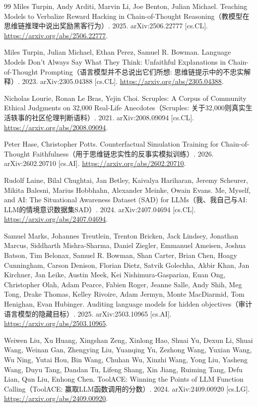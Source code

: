 \begin{thebibliography}{99}
 Miles Turpin, Andy Arditi, Marvin Li, Joe Benton, Julian Michael. Teaching Models to Verbalize Reward Hacking in Chain-of-Thought Reasoning（教模型在思维链推理中说出奖励黑客行为）. 2025. arXiv:2506.22777 [cs.CL]. \url{https://arxiv.org/abs/2506.22777}.

 Miles Turpin, Julian Michael, Ethan Perez, Samuel R. Bowman. Language Models Don't Always Say What They Think: Unfaithful Explanations in Chain-of-Thought Prompting（语言模型并不总说出它们所想: 思维链提示中的不忠实解释）. 2023. arXiv:2305.04388 [cs.CL]. \url{https://arxiv.org/abs/2305.04388}.

 Nicholas Lourie, Ronan Le Bras, Yejin Choi. Scruples: A Corpus of Community Ethical Judgments on 32,000 Real-Life Anecdotes（Scruples: 关于32,000则真实生活轶事的社区伦理判断语料）. 2021. arXiv:2008.09094 [cs.CL]. \url{https://arxiv.org/abs/2008.09094}.

 Peter Hase, Christopher Potts. Counterfactual Simulation Training for Chain-of-Thought Faithfulness（用于思维链忠实性的反事实模拟训练）. 2026. arXiv:2602.20710 [cs.AI]. \url{https://arxiv.org/abs/2602.20710}.

 Rudolf Laine, Bilal Chughtai, Jan Betley, Kaivalya Hariharan, Jeremy Scheurer, Mikita Balesni, Marius Hobbhahn, Alexander Meinke, Owain Evans. Me, Myself, and AI: The Situational Awareness Dataset (SAD) for LLMs（我、我自己与AI: LLM的情境意识数据集SAD）. 2024. arXiv:2407.04694 [cs.CL]. \url{https://arxiv.org/abs/2407.04694}.

 Samuel Marks, Johannes Treutlein, Trenton Bricken, Jack Lindsey, Jonathan Marcus, Siddharth Mishra-Sharma, Daniel Ziegler, Emmanuel Ameisen, Joshua Batson, Tim Belonax, Samuel R. Bowman, Shan Carter, Brian Chen, Hoagy Cunningham, Carson Denison, Florian Dietz, Satvik Golechha, Akbir Khan, Jan Kirchner, Jan Leike, Austin Meek, Kei Nishimura-Gasparian, Euan Ong, Christopher Olah, Adam Pearce, Fabien Roger, Jeanne Salle, Andy Shih, Meg Tong, Drake Thomas, Kelley Rivoire, Adam Jermyn, Monte MacDiarmid, Tom Henighan, Evan Hubinger. Auditing language models for hidden objectives（审计语言模型的隐藏目标）. 2025. arXiv:2503.10965 [cs.AI]. \url{https://arxiv.org/abs/2503.10965}.

 Weiwen Liu, Xu Huang, Xingshan Zeng, Xinlong Hao, Shuai Yu, Dexun Li, Shuai Wang, Weinan Gan, Zhengying Liu, Yuanqing Yu, Zezhong Wang, Yuxian Wang, Wu Ning, Yutai Hou, Bin Wang, Chuhan Wu, Xinzhi Wang, Yong Liu, Yasheng Wang, Duyu Tang, Dandan Tu, Lifeng Shang, Xin Jiang, Ruiming Tang, Defu Lian, Qun Liu, Enhong Chen. ToolACE: Winning the Points of LLM Function Calling（ToolACE: 赢取LLM函数调用的分数）. 2024. arXiv:2409.00920 [cs.LG]. \url{https://arxiv.org/abs/2409.00920}.


\end{thebibliography}
